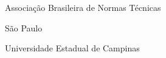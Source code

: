 \item[ABNT] Associação Brasileira de Normas Técnicas
\item[SP] São Paulo
\item[UNICAMP] Universidade Estadual de Campinas
